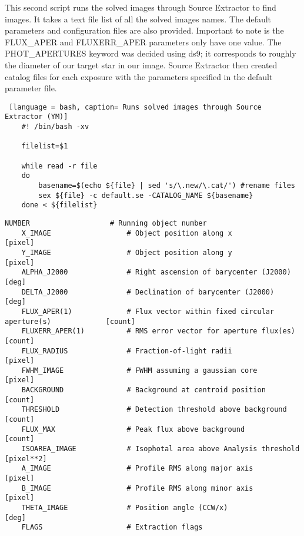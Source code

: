 \documentclass{aastex}
\begin{document}
This second script runs the solved images through Source Extractor to find images. It takes a text file list of all the solved images names. The default parameters and configuration files are also provided. Important to note is the FLUX_APER and FLUXERR_APER parameters only have one value. The PHOT_APERTURES keyword was decided using ds9; it corresponds to roughly the diameter of our target star in our image. Source Extractor then created catalog files for each exposure with the parameters specified in the default parameter file.
\begin{lstlisting} [language = bash, caption= Runs solved images through Source Extractor (YM)]
	#! /bin/bash -xv
	
	filelist=$1
	
	while read -r file
	do
		basename=$(echo ${file} | sed 's/\.new/\.cat/') #rename files
		sex ${file} -c default.se -CATALOG_NAME ${basename}
	done < ${filelist}
\end{lstlisting}

\begin{lstlisting}[caption = Default parameters for Source Extractor (YM)]
	NUMBER                   # Running object number  
	X_IMAGE                  # Object position along x                                   [pixel]
	Y_IMAGE                  # Object position along y                                   [pixel]
	ALPHA_J2000              # Right ascension of barycenter (J2000)                     [deg]
	DELTA_J2000              # Declination of barycenter (J2000)                         [deg]
	FLUX_APER(1)             # Flux vector within fixed circular aperture(s)             [count]
	FLUXERR_APER(1)          # RMS error vector for aperture flux(es)                    [count]
	FLUX_RADIUS              # Fraction-of-light radii                                   [pixel]
	FWHM_IMAGE               # FWHM assuming a gaussian core                             [pixel]
	BACKGROUND               # Background at centroid position                           [count]
	THRESHOLD                # Detection threshold above background                      [count]
	FLUX_MAX                 # Peak flux above background                                [count]
	ISOAREA_IMAGE            # Isophotal area above Analysis threshold                   [pixel**2]
	A_IMAGE                  # Profile RMS along major axis                              [pixel]
	B_IMAGE                  # Profile RMS along minor axis                              [pixel]
	THETA_IMAGE              # Position angle (CCW/x)                                    [deg]
	FLAGS                    # Extraction flags                                         
\end{lstlisting}
\end{document}

